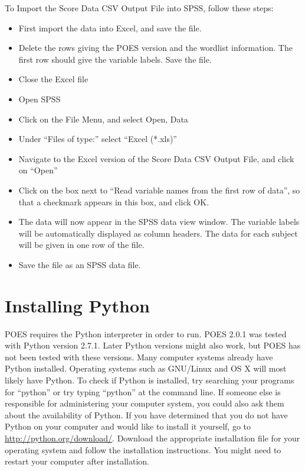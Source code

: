 \documentclass[11pt]{article}
\newcommand{\poesver}{2.0.1}
\numberwithin{figure}{section}
\numberwithin{table}{section}
\begin{document}
To Import the Score Data CSV Output File into SPSS, follow these steps:
\begin{itemize}
\item[] First import the data into Excel, and save the file.
\item[] Delete the rows giving the POES version and the wordlist information.  The first row should give the variable labels.  Save the file.
\item[] Close the Excel file
\item[] Open SPSS
\item[] Click on the File Menu, and select Open, Data
\item[] Under ``Files of type:'' select ``Excel (*.xls)''
\item[] Navigate to the Excel version of the Score Data CSV Output File, and click on ``Open''
\item[] Click on the box next to ``Read variable names from the first row of data'', so that a checkmark appears in this box, and click OK.
\item[] The data will now appear in the SPSS data view window.  The variable labels will be automatically displayed as column headers.  The data for each subject will be given in one row of the file.
\item[] Save the file as an SPSS data file.
\end{itemize}

 
\section{Installing Python}
\label{sec:python}

POES requires the Python interpreter in order to run.  POES \poesver{ }was tested with Python version 2.7.1.  Later Python versions might also work, but POES has not been tested with these versions.
Many computer systems already have Python installed.  Operating systems such as GNU/Linux and OS X will most likely have Python.
To check if Python is installed, try searching your programs for ``python'' or try typing ``python'' at the command line.  If someone else is responsible for administering your computer system, you could also ask them about the availability of Python.  
If you have determined that you do not have Python on your computer and would like to install it yourself, go to 
\url{http://python.org/download/}.
Download the appropriate installation file for your operating system and follow the installation instructions.  You might need to restart your computer after installation.
 
\end{document}
